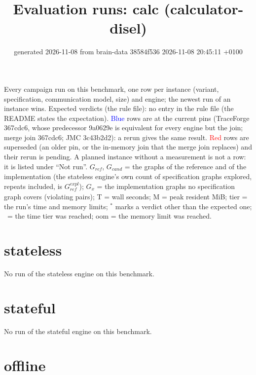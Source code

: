 \documentclass[10pt]{article}
\title{Evaluation runs: \textsf{calc} (calculator-disel)}
\author{}
\date{generated 2026-11-08 from brain-data 38584f536 2026-11-08 20:45:11 +0100}
\begin{document}
\maketitle\small
\noindent Every campaign run on this benchmark, one row per instance (variant, specification, communication model, size) and engine; the newest run of an instance wins. Expected verdicts (the rule file): no entry in the rule file (the README states the expectation). \textcolor{blue}{Blue} rows are at the current pins (TraceForge 367cdc6, whose predecessor 9a0629e is equivalent for every engine but the join; merge join 367cdc6; JMC 3c43b2d2): a rerun gives the same result. \textcolor{red}{Red} rows are superseded (an older pin, or the in-memory join that the merge join replaces) and their rerun is pending. A planned instance without a measurement is not a row: it is listed under ``Not run''. $G_{\mathit{ref}}$, $G_{\mathit{cand}}$ = the graphs of the reference and of the implementation (the stateless engine's own count of specification graphs explored, repeats included, is $G_{\mathit{ref}}^{\mathit{expl}}$); $G_x$ = the implementation graphs no specification graph covers (violating pairs); T = wall seconds; M = peak resident MiB; tier = the run's time and memory limits; $^{\ast}$ marks a verdict other than the expected one; \faClock\ = the time tier was reached; oom = the memory limit was reached.

\section*{stateless}\noindent No run of the stateless engine on this benchmark.
\section*{stateful}\noindent No run of the stateful engine on this benchmark.
\section*{offline}
\end{document}
